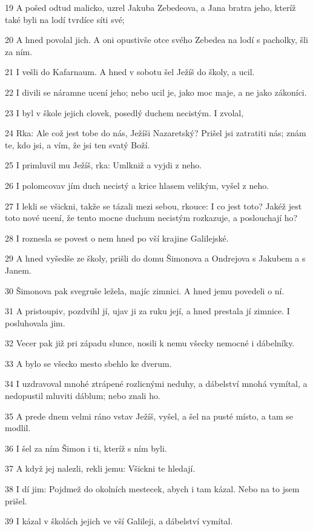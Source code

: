 \par 19 A pošed odtud malicko, uzrel Jakuba Zebedeova, a Jana bratra jeho, kteríž také byli na lodí tvrdíce síti své;
\par 20 A hned povolal jich. A oni opustivše otce svého Zebedea na lodí s pacholky, šli za ním.
\par 21 I vešli do Kafarnaum. A hned v sobotu šel Ježíš do školy, a ucil.
\par 22 I divili se náramne ucení jeho; nebo ucil je, jako moc maje, a ne jako zákoníci.
\par 23 I byl v škole jejich clovek, posedlý duchem necistým. I zvolal,
\par 24 Rka: Ale což jest tobe do nás, Ježíši Nazaretský? Prišel jsi zatratiti nás; znám te, kdo jsi, a vím, že jsi ten svatý Boží.
\par 25 I primluvil mu Ježíš, rka: Umlkniž a vyjdi z neho.
\par 26 I polomcovav jím duch necistý a krice hlasem velikým, vyšel z neho.
\par 27 I lekli se všickni, takže se tázali mezi sebou, rkouce: I co jest toto? Jakéž jest toto nové ucení, že tento mocne duchum necistým rozkazuje, a poslouchají ho?
\par 28 I roznesla se povest o nem hned po vší krajine Galilejské.
\par 29 A hned vyšedše ze školy, prišli do domu Šimonova a Ondrejova s Jakubem a s Janem.
\par 30 Šimonova pak svegruše ležela, majíc zimnici. A hned jemu povedeli o ní.
\par 31 A pristoupiv, pozdvihl jí, ujav ji za ruku její, a hned prestala jí zimnice. I posluhovala jim.
\par 32 Vecer pak již pri západu slunce, nosili k nemu všecky nemocné i dábelníky.
\par 33 A bylo se všecko mesto sbehlo ke dverum.
\par 34 I uzdravoval mnohé ztrápené rozlicnými neduhy, a dábelství mnohá vymítal, a nedopustil mluviti dáblum; nebo znali ho.
\par 35 A prede dnem velmi ráno vstav Ježíš, vyšel, a šel na pusté místo, a tam se modlil.
\par 36 I šel za ním Šimon i ti, kteríž s ním byli.
\par 37 A když jej nalezli, rekli jemu: Všickni te hledají.
\par 38 I dí jim: Pojdmež do okolních mestecek, abych i tam kázal. Nebo na to jsem prišel.
\par 39 I kázal v školách jejich ve vší Galileji, a dábelství vymítal.
